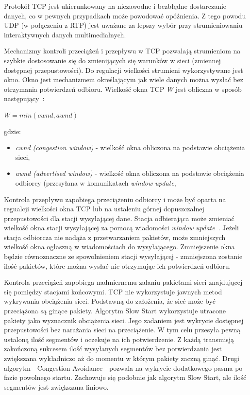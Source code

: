 Protokół TCP jest ukierunkowany na niezawodne i bezbłędne dostarczanie danych, co w pewnych przypadkach może powodować opóźnienia. Z tego powodu UDP (w połączeniu z RTP) jest uważane za lepszy wybór przy strumieniowaniu interaktywnych danych multimedialnych. 

Mechanizmy kontroli przeciążeń i przepływu w TCP pozwalają strumieniom na szybkie dostosowanie się do zmienijących się warunków w sieci (zmiennej dostępnej przepustowości). Do regulacji wielkości strumieni wykorzystywane jest okno. Okno jest mechanizmem określającym jak wiele danych można wysłać bez otrzymania potwierdzeń odbioru. Wielkość okna TCP \textit{W} jest obliczna w sposób następujący~\cite{Stevens}:
\begin{center}
$W = min(cwnd, awnd)$
\end{center}
gdzie: 
\begin{itemize}
\item \textit{cwnd (congestion window)} - wielkość okna obliczona na podstawie obciążenia sieci,
\item \textit{awnd (advertised window)} - wielkość okna obliczona na podstawie obciążenia odbiorcy (przesyłana w komunikatach \textit{window update},
\end{itemize}

Kontrola przepływu zapobiega przeciążeniu odbiorcy i może być oparta na regualcji wielkości okna TCP lub na ustaleniu górnej dopuszczalnej przepustowości dla stacji wysyłającej dane.  Stacja odbierająca może zmieniać wielkość okna stacji wysyłającej za pomocą wiadomości \textit{window update}~\cite{Stevens}. Jeżeli stacja odbiorcza nie nadąża z przetwarzaniem pakietów, może zmniejszych wielkość okna ogłaszną w wiadomościach do wysyłającego. Zmniejszenie okna będzie równoznaczne ze spowolnieniem stacji wysyłającej - zmniejszona zostanie ilość pakietów, które można wysłać nie otrzymując ich potwierdzeń odbioru.

Kontrola przeciążeń zapobiega nadmiernemu zalaniu pakietami sieci znajdującej się pomiędzy stacjami końcowymi. TCP nie wykorzystuje  jawnych metod wykrywania obciążenia sieci. Podstawną do założenia, że sieć może być przeciążona są ginące pakiety. Algorytm Slow Start wykorzystuje utracone pakiety jako wyznacznik obciążenia sieci. 
Jego zadaniem jest wykrycie dostępnej przepustowości bez narażania sieci na przeciążenie. W tym celu przesyła pewną ustaloną ilość segmentów i oczekuje na ich potwierdzenie. Z każdą transmisją zakończoną sukcesem ilość wysyłanych segmentów bez potwierdzania jest zwiększana wykładniczo aż do momentu w którym pakiety zaczną ginąć. Drugi algorytm - Congestion Avoidance - pozwala na wykrycie dodatkowego pasma po fazie powolnego startu. Zachowuje się podobnie jak algorytm Slow Start, ale ilość segmentów jest zwiększana liniowo.~\cite{RFC793}

